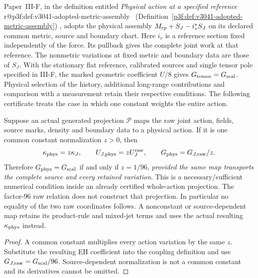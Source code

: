 \documentclass[12pt,a4paper]{article}
\begin{document}
\begin{definition}
\begin{enumerate}[label=(\roman*)]
Paper~III-F, in the definition entitled \emph{Physical action at a specified reference}%
\ifcsname r@p3f:def:v3041-adopted-metric-assembly\endcsname
\ (Definition~\ref{p3f:def:v3041-adopted-metric-assembly})%
\fi,
adopts the physical assembly \(M_{\rm rp}+S_J-i_v^*S_J\) on its
declared common metric, source and boundary chart. Here \(i_v\) is a
reference section fixed independently of the force. Its pullback gives
the complete joint work at that reference. The nonmetric variations at
fixed metric and boundary data are those of \(S_J\). With the stationary
flat reference, calibrated sources and single tensor pole specified in
III-F, the marked geometric coefficient \(U/8\) gives
\(G_{\rm tensor}=G_{\rm scal}\). Physical selection of the history,
additional long-range contributions and comparison with a measurement
retain their respective conditions. The following certificate treats the
case in which one constant weights the entire action.
\begin{proposition}
\label{p3e:prop:v2211-whole-action-newton-certificate}
Suppose an actual generated projection $\mathcal P$ maps the raw joint
action, fields, source marks, density and boundary data to a physical action.
If it is one common constant normalization $z>0$, then
\[
 \kappa_{\rm phys}=z\kappa_J,\qquad
 U_{J,\rm phys}=zU_J^{\rm raw},\qquad
 G_{\rm phys}=G_{J,\rm raw}/z.
\]
Therefore $G_{\rm phys}=G_{\rm scal}$ if and only if $z=1/96$,
\emph{provided the same map transports the complete source and every
retained variation}. This is a necessary/sufficient numerical condition
inside an already certified whole-action projection. The factor-96 raw
relation does not construct that projection. In particular no equality of
the two raw coordinates follows. A nonconstant or source-dependent map
retains its product-rule and mixed-jet terms and uses the actual resulting
$\kappa_{\rm phys}$ instead.
\end{proposition}
\begin{proof}
A common constant multiplies every action variation by the same $z$.
Substitute the resulting EH coefficient into the coupling definition and use
$G_{J,\rm raw}=G_{\rm scal}/96$. Source-dependent normalization is
not a common constant and its derivatives cannot be omitted.
\end{proof}


\end{enumerate}
\end{definition}
\end{document}
